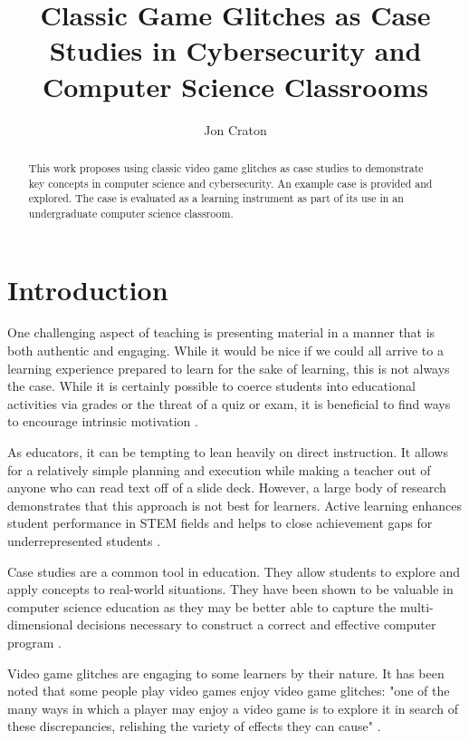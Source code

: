 \documentclass[letterpaper]{article}
\title{Classic Game Glitches as Case Studies in Cybersecurity and Computer Science Classrooms}
\author[1]{Jon Craton}
\affil[1]{Anderson University, Anderson, IN}
\date{} %
\begin{document}
\maketitle

\begin{abstract}
This work proposes using classic video game glitches as case studies to demonstrate key concepts in computer science and cybersecurity. An example case is provided and explored. The case is evaluated as a learning instrument as part of its use in an undergraduate computer science classroom.
\end{abstract}

\section{Introduction}
One challenging aspect of teaching is presenting material in a manner that is both authentic and engaging. While it would be nice if we could all arrive to a learning experience prepared to learn for the sake of learning, this is not always the case. While it is certainly possible to coerce students into educational activities via grades or the threat of a quiz or exam, it is beneficial to find ways to encourage intrinsic motivation \cite{deci2013intrinsic}.

As educators, it can be tempting to lean heavily on direct instruction. It allows for a relatively simple planning and execution while making a teacher out of anyone who can read text off of a slide deck. However, a large body of research demonstrates that this approach is not best for learners. Active learning enhances student performance in STEM fields \cite{freeman2014active} and helps to close achievement gaps for underrepresented students \cite{theobald2020active}.

Case studies are a common tool in education. They allow students to explore and apply concepts to real-world situations. They have been shown to be valuable in computer science education as they may be better able to capture the multi-dimensional decisions necessary to construct a correct and effective computer program \cite{linn1992case}.

Video game glitches are engaging to some learners by their nature. It has been noted that some people play video games enjoy video game glitches: "one of the many ways in which a player may enjoy a video game is to explore it in search of these discrepancies, relishing the variety of effects they can cause" \cite{bainbridge2007creative}.
\end{document}
